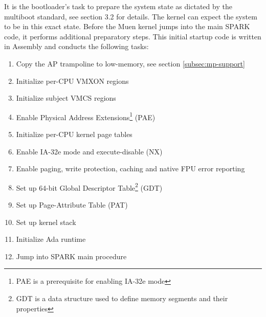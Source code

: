 It is the bootloader's task to prepare the system state as dictated by the
multiboot standard, see \cite{multiboot} section 3.2 for details. The kernel
can expect the system to be in this exact state. Before the Muen kernel jumps
into the main SPARK code, it performs additional preparatory steps. This
initial startup code is written in Assembly and conducts the following tasks:

\begin{enumerate}
	\item Copy the AP trampoline to low-memory, see section
		\ref{subsec:mp-support} \item Initialize per-CPU VMXON regions
	\item Initialize subject VMCS regions
	\item Enable Physical Address Extensions\footnote{PAE is a prerequisite for enabling IA-32e mode} (PAE)
	\item Initialize per-CPU kernel page tables
	\item Enable IA-32e mode and execute-disable (NX)
	\item Enable paging, write protection, caching and native FPU error
		reporting
	\item Set up 64-bit Global Descriptor Table\footnote{GDT is a data structure used to define memory segments and their properties} (GDT)
	\item Set up Page-Attribute Table (PAT)
	\item Set up kernel stack
	\item Initialize Ada runtime
	\item Jump into SPARK main procedure
\end{enumerate}
